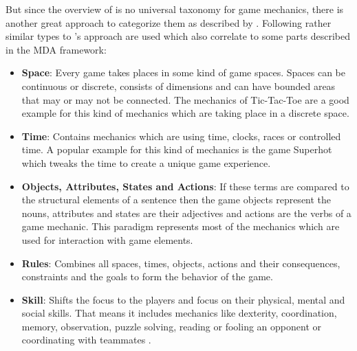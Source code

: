 \documentclass[MGS,Master,english]{twbook}%
\begin{document}
But since the overview of \cite{gameDesign::gameMechanicsAdvancedGameDesign} is no universal taxonomy for game mechanics, there is another great approach to categorize them as described by \cite{gameDesign::bookOfLenses}. Following rather similar types to \cite{gameDesign::gameMechanicsAdvancedGameDesign}'s approach are used which also correlate to some parts described in the MDA framework:
\begin{itemize}
	\item \textbf{Space}: Every game takes places in some kind of game spaces. Spaces can be continuous or discrete, consists of dimensions and can have bounded areas that may or may not be connected. The mechanics of Tic-Tac-Toe are a good example for this kind of mechanics which are taking place in a discrete space. \cite{gameDesign::bookOfLenses}
	\item \textbf{Time}: Contains mechanics which are using time, clocks, races or controlled time. A popular example for this kind of mechanics is the game Superhot which tweaks the time to create a unique game experience. \cite{gameDesign::bookOfLenses}
	\item \textbf{Objects, Attributes, States and Actions}: If these terms are compared to the structural elements of a sentence then the game objects represent the nouns, attributes and states are their adjectives and actions are the verbs of a game mechanic. This paradigm represents most of the mechanics which are used for interaction with game elements. \cite{gameDesign::bookOfLenses}
	\item \textbf{Rules}: Combines all spaces, times, objects, actions and their consequences, constraints and the goals to form the behavior of the game. \cite{gameDesign::bookOfLenses}
	\item \textbf{Skill}: Shifts the focus to the players and focus on their physical, mental and social skills. That means it includes mechanics like dexterity, coordination, memory, observation, puzzle solving, reading or fooling an opponent or coordinating with teammates .  \cite{gameDesign::bookOfLenses}
\end{itemize}

\end{document}

